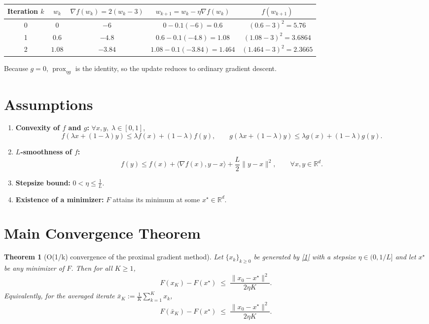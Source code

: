 \documentclass{article}
\newtheorem{theorem}{Theorem}
\newcommand{\prox}{\operatorname{prox}}
\newcommand{\grad}{\nabla}
\newcommand{\R}{\mathbb{R}}
\begin{document}
\begin{center}
\begin{tabular}{@{}c c c c c@{}}
\toprule
Iteration $k$ & $w_{k}$ & $\grad f(w_{k})=2(w_{k}-3)$ & $w_{k+1}=w_{k}-\eta\grad f(w_{k})$ & $f(w_{k+1})$\\
\midrule
0 & $0$ & $-6$ & $0-0.1(-6)=0.6$ & $(0.6-3)^{2}=5.76$\\
1 & $0.6$ & $-4.8$ & $0.6-0.1(-4.8)=1.08$ & $(1.08-3)^{2}=3.6864$\\
2 & $1.08$ & $-3.84$ & $1.08-0.1(-3.84)=1.464$ & $(1.464-3)^{2}=2.3665$\\
\bottomrule
\end{tabular}
\end{center}
Because $g=0$, $\prox_{\eta g}$ is the identity, so the update reduces to ordinary gradient descent.

\newpage
\section*{Assumptions}
\begin{enumerate}
  \item \textbf{Convexity of $f$ and $g$:} $\forall x,y,\;\lambda\in[0,1]$,
        \[
        f(\lambda x+(1-\lambda)y)\le \lambda f(x)+(1-\lambda)f(y),\qquad
        g(\lambda x+(1-\lambda)y)\le \lambda g(x)+(1-\lambda)g(y).
        \]
  \item \textbf{$L$‑smoothness of $f$:}
        \[
        f(y)\le f(x)+\langle\grad f(x),y-x\rangle+\frac{L}{2}\|y-x\|^{2},
        \qquad\forall x,y\in\R^{d}. \tag{A2}
        \]
  \item \textbf{Stepsize bound:} $\displaystyle 0<\eta\le\frac{1}{L}$.
  \item \textbf{Existence of a minimizer:} $F$ attains its minimum at some $x^{\star}\in\R^{d}$.
\end{enumerate}

\section*{Main Convergence Theorem}
\begin{theorem}[O(1/k) convergence of the proximal gradient method]\label{thm:main}
Let $\{x_{k}\}_{k\ge0}$ be generated by \eqref{1} with a stepsize $\eta\in(0,1/L]$ and let $x^{\star}$ be any minimizer of $F$. Then for all $K\ge1$,
\[
F(x_{K})-F(x^{\star})\;\le\;\frac{\|x_{0}-x^{\star}\|^{2}}{2\eta K}.
\tag{3}
\]
Equivalently, for the averaged iterate $\bar{x}_{K}:=\frac{1}{K}\sum_{k=1}^{K}x_{k}$,
\[
F(\bar{x}_{K})-F(x^{\star})\;\le\;\frac{\|x_{0}-x^{\star}\|^{2}}{2\eta K}.
\tag{4}
\]
\end{theorem}
\end{document}
